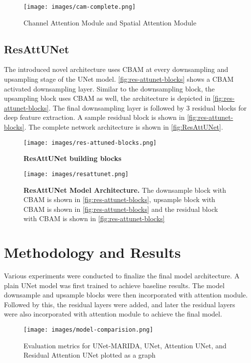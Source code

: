 \documentclass[review]{elsarticle}
\begin{document}
\begin{figure}[t]
\caption{Channel Attention Module and Spatial Attention Module}
\centering
\texttt{[image: images/cam-complete.png]}
\label{fig:CAM and SAM}
\end{figure}

\subsection{ResAttUNet}
The introduced novel architecture uses CBAM at every downsampling and upsampling stage of the UNet model. \autoref{fig:res-attunet-blocks} shows a CBAM activated downsampling layer. Similar to the downsampling block, the upsampling block uses CBAM as well, the architecture is depicted in \autoref{fig:res-attunet-blocks}. The final downsampling layer is followed by 3 residual blocks for deep feature extraction. A sample residual block is shown in \autoref{fig:res-attunet-blocks}. The complete network architecture is shown in \autoref{fig:ResAttUNet}.

\begin{figure}[h]
\caption{\textbf{ResAttUNet building blocks}}
\centering
\texttt{[image: images/res-attuned-blocks.png]}
\label{fig:res-attunet-blocks}
\end{figure}

\begin{figure}[h]
\caption{\textbf{ResAttUNet Model Architecture.} The downsample block with CBAM is shown in \autoref{fig:res-attunet-blocks}, upsample block with CBAM is shown in \autoref{fig:res-attunet-blocks} and the residual block with CBAM is shown in \autoref{fig:res-attunet-blocks}}
\centering
\texttt{[image: images/resattunet.png]}
\label{fig:ResAttUNet}
\end{figure}

\section{Methodology and Results}

Various experiments were conducted to finalize the final model architecture. A plain UNet model was first trained to achieve baseline results. The model downsample and upsample blocks were then incorporated with attention module. Followed by this, the residual layers were added, and later the residual layers were also incorporated with attention module to achieve the final model.

\begin{figure}[h]
\caption{Evaluation metrics for UNet-MARIDA, UNet, Attention UNet, and Residual Attention UNet plotted as a graph}
\centering
\texttt{[image: images/model-comparision.png]}
\label{fig:modelcomparision}
\end{figure}
\end{document}
